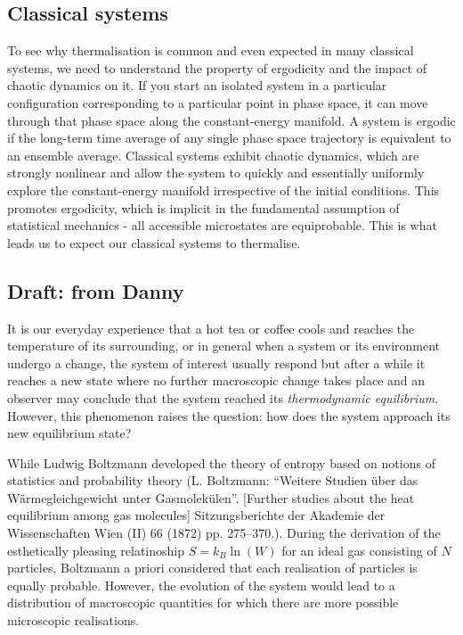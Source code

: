 \documentclass[a4paper, 10pt, draft]{article}
\theoremstyle{plain}
\begin{document}
\subsection{Classical systems}

To see why thermalisation is common and even expected in many classical
systems, we need to understand the property of ergodicity and the impact of
chaotic dynamics on it. If you start an isolated system in a particular
configuration corresponding to a particular point in phase space, it can move
through that phase space along the constant-energy manifold. A system is
ergodic if the long-term time average of any single phase space trajectory
is equivalent to an ensemble average.  Classical systems
exhibit chaotic dynamics, which are strongly nonlinear and allow the system to
quickly and essentially uniformly explore the constant-energy manifold
irrespective of the initial conditions. This promotes ergodicity, which is
implicit in the fundamental assumption of statistical mechanics - all
accessible microstates are equiprobable.  This is what leads us to expect
our classical systems to thermalise.

\subsection{Draft: from Danny}

It is our everyday experience that a hot tea or coffee cools and reaches the
temperature of its surrounding, or in general when a system or its environment
undergo a change, the system of interest usually respond but after a while it
reaches a new state where no further macroscopic change takes place and an
observer may conclude that the system reached its {\emph{thermodynamic
equilibrium}}. However, this phenomenon raises the question: how does the system
approach its new equilibrium state?

While Ludwig Boltzmann developed the theory of entropy based on notions of
statistics and probability theory (L. Boltzmann: ``Weitere Studien über das
Wärmegleichgewicht unter Gasmolekülen''. [Further studies about the heat
equilibrium among gas molecules] Sitzungsberichte der Akademie der
Wissenschaften Wien (II) 66 (1872) pp. 275–370.). During the derivation of the
esthetically pleasing relatinoship $S=k_{B}\ln{\!(W)}$ for an ideal gas
consisting of $N$ particles, Boltzmann a priori considered that each realisation
of particles is equally probable. However, the evolution of the system would
lead to a distribution of macroscopic quantities for which there are more
possible microscopic realisations.
\end{document}
